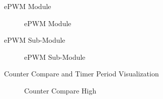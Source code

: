 \begin{frame}{ePWM Module}
	\begin{figure}
		\centering


		\caption{ePWM Module}
	\end{figure}
\end{frame}



\begin{frame}{ePWM Sub-Module}
	\begin{figure}
		\centering
		\caption{ePWM Sub-Module}
	\end{figure}
\end{frame}



\begin{frame}{Counter Compare and Timer Period Visualization}
	\begin{figure}
		\centering
		\caption{Counter Compare High}
	\end{figure}
\end{frame}

